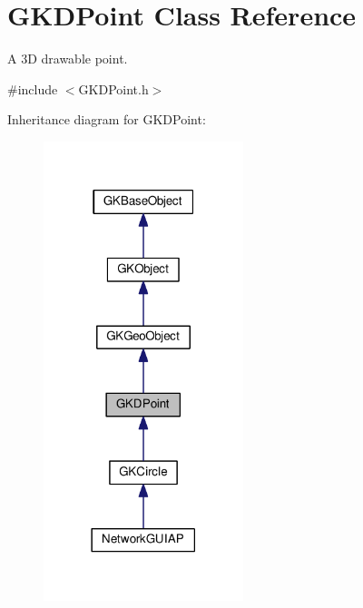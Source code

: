 \hypertarget{classGKDPoint}{}\section{G\+K\+D\+Point Class Reference}
\label{classGKDPoint}


A 3D drawable point.  




{\ttfamily \#include $<$G\+K\+D\+Point.\+h$>$}



Inheritance diagram for G\+K\+D\+Point\+:
\nopagebreak
\begin{figure}[H]
\begin{center}
\leavevmode
\includegraphics[width=165pt]{classGKDPoint__inherit__graph}
\end{center}
\end{figure}


